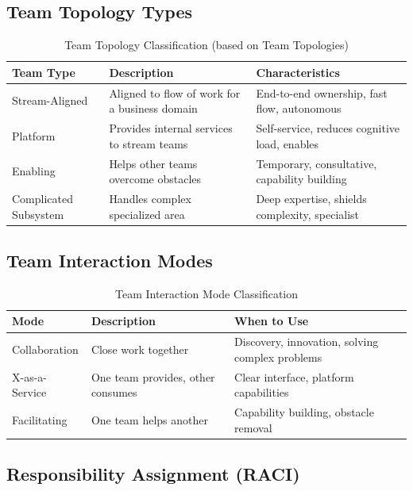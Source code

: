\documentclass[11pt,letterpaper]{article}
\begin{document}
\subsection{Team Topology Types}

\begin{table}[H]
\centering
\caption{Team Topology Classification (based on Team Topologies)}
\small
\begin{tabular}{@{}L{2.5cm}L{4.5cm}L{5.5cm}@{}}
\toprule
\textbf{Team Type} & \textbf{Description} & \textbf{Characteristics} \\
\midrule
Stream-Aligned & Aligned to flow of work for a business domain & End-to-end ownership, fast flow, autonomous \\
\addlinespace
Platform & Provides internal services to stream teams & Self-service, reduces cognitive load, enables \\
\addlinespace
Enabling & Helps other teams overcome obstacles & Temporary, consultative, capability building \\
\addlinespace
Complicated Subsystem & Handles complex specialized area & Deep expertise, shields complexity, specialist \\
\bottomrule
\end{tabular}
\end{table}

\subsection{Team Interaction Modes}

\begin{table}[H]
\centering
\caption{Team Interaction Mode Classification}
\small
\begin{tabular}{@{}L{2.5cm}L{4cm}L{6cm}@{}}
\toprule
\textbf{Mode} & \textbf{Description} & \textbf{When to Use} \\
\midrule
Collaboration & Close work together & Discovery, innovation, solving complex problems \\
\addlinespace
X-as-a-Service & One team provides, other consumes & Clear interface, platform capabilities \\
\addlinespace
Facilitating & One team helps another & Capability building, obstacle removal \\
\bottomrule
\end{tabular}
\end{table}

\subsection{Responsibility Assignment (RACI)}
\end{document}
